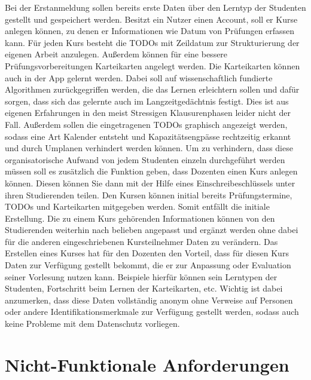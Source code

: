Bei der Erstanmeldung sollen bereits erste Daten über den Lerntyp der Studenten gestellt und gespeichert werden.
Besitzt ein Nutzer einen Account, soll er Kurse anlegen können, zu denen er Informationen wie Datum von Prüfungen erfassen kann.
Für jeden Kurs besteht die TODOs mit Zeildatum zur Strukturierung der eigenen Arbeit anzulegen.
Außerdem können für eine bessere Prüfungsvorbereitungen Karteikarten angelegt werden.
Die Karteikarten können auch in der App gelernt werden.
Dabei soll auf wissenschaftlich fundierte Algorithmen zurückgegriffen werden, die das Lernen erleichtern sollen und dafür sorgen, dass sich das gelernte auch im Langzeitgedächtnis festigt.
Dies ist aus eigenen Erfahrungen in den meist Stressigen Klausurenphasen leider nicht der Fall.
Außerdem sollen die eingetragenen TODOs graphisch angezeigt werden, sodass eine Art Kalender entsteht und Kapazitätsengpässe rechtzeitig erkannt und durch Umplanen verhindert werden können.
Um zu verhindern, dass diese organisatorische Aufwand von jedem Studenten einzeln durchgeführt werden müssen soll es zusätzlich die Funktion geben, dass Dozenten einen Kurs anlegen können.
Diesen können Sie dann mit der Hilfe eines Einschreibeschlüssels unter ihren Studierenden teilen.
Den Kursen können initial bereits Prüfungstermine, TODOs und Karteikarten mitgegeben werden.
Somit entfällt die initiale Erstellung.
Die zu einem Kurs gehörenden Informationen können von den Studierenden weiterhin nach belieben angepasst und ergänzt werden ohne dabei für die anderen eingeschriebenen Kursteilnehmer Daten zu verändern.
Das Erstellen eines Kurses hat für den Dozenten den Vorteil, dass für diesen Kurs Daten zur Verfügung gestellt bekommt, die er zur Anpassung oder Evaluation seiner Vorlesung nutzen kann.
Beispiele hierfür können sein Lerntypen der Studenten, Fortschritt beim Lernen der Karteikarten, etc.
Wichtig ist dabei anzumerken, dass diese Daten vollständig anonym ohne Verweise auf Personen oder andere Identifikationsmerkmale zur Verfügung gestellt werden, sodass auch keine Probleme mit dem Datenschutz vorliegen. 



\section{Nicht-Funktionale Anforderungen}







